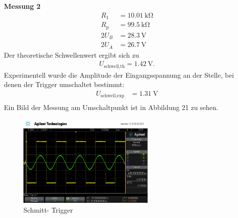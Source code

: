 \documentclass{scrartcl}
\begin{document}
\textbf{Messung 2}
\begin{align}
R_1 &= \SI{10,01}{\kilo \ohm}\\
R_\text{p} &= \SI{99,5}{\kilo \ohm}\\
2U_B&=\SI{28,3}{\volt}\\
2U_A&=\SI{26,7}{\volt}
\end{align}
Der theoretische Schwellenwert ergibt sich zu
\begin{align}
U_\text{schwell,th} = \SI{1,42}{\volt}.
\end{align}
Experimentell wurde die Amplitude der Eingangsspannung an der Stelle, bei denen der Trigger umschaltet bestimmt:
\begin{align}
U_\text{schwell,exp} &= \SI{1,31}{\volt}\\
\end{align}
Ein Bild der Messung am Umschaltpunkt ist in Abbildung 21 zu sehen.
 \begin{figure}[!h]
\centering
\includegraphics[width=0.6\textwidth]{aufnahmen_neu/scope_196.png}
\caption{Schmitt- Trigger}
\label{schmitttrigger}
\end{figure}
\end{document}
